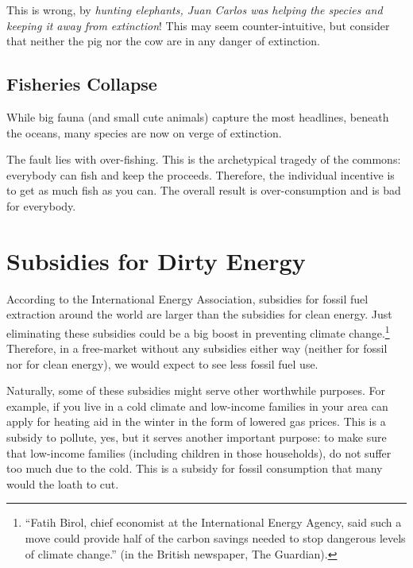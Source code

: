This is wrong, by \emph{hunting elephants, Juan Carlos was helping the
species and keeping it away from extinction}! This may seem counter-intuitive,
but consider that neither the pig nor the cow are in any danger of extinction.


\subsection{Fisheries Collapse}

While big fauna (and small cute animals) capture the most headlines, beneath
the oceans, many species are now on verge of extinction.

The fault lies with over-fishing. This is the archetypical tragedy of the
commons: everybody can fish and keep the proceeds. Therefore, the individual
incentive is to get as much fish as you can. The overall result is
over-consumption and is bad for everybody.

\section{Subsidies for Dirty Energy}

According to the International Energy Association, subsidies for fossil fuel
extraction around the world are larger than the subsidies for clean energy.
Just eliminating these subsidies could be a big boost in preventing climate
change.\footnote{``Fatih Birol, chief
economist at the International Energy Agency, said such a move could
provide half of the carbon savings needed to stop dangerous levels of climate
change.'' (in the British newspaper, The Guardian).%
} Therefore, in a free-market without any subsidies either way (neither for
fossil nor for clean energy), we would expect to see less fossil fuel use.

Naturally, some of these subsidies might serve other worthwhile purposes. For
example, if you live in a cold climate and low-income families in your area can
apply for heating aid in the winter in the form of lowered gas prices. This is
a subsidy to pollute, yes, but it serves another important purpose: to make
sure that low-income families (including children in those households), do not
suffer too much due to the cold. This is a subsidy for fossil consumption that
many would the loath to cut.

